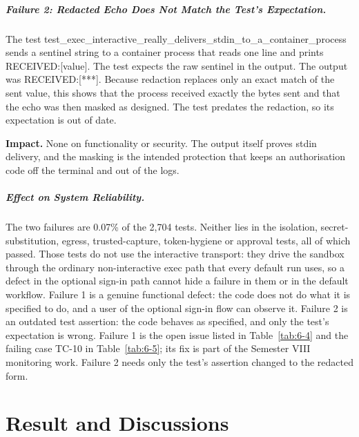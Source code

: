\documentclass[12pt,a4paper,oneside]{report}
\begin{document}
\paragraph{Failure 2: Redacted Echo Does Not Match the Test's Expectation.}\label{failure-2}

The test test\_\allowbreak{}exec\_\allowbreak{}interactive\_\allowbreak{}really\_\allowbreak{}delivers\_\allowbreak{}stdin\_\allowbreak{}to\_\allowbreak{}a\_\allowbreak{}container\_\allowbreak{}process sends a sentinel string to a container process that reads one line and prints RECEIVED:[value]. The test expects the raw sentinel in the output. The output was RECEIVED:[***]. Because redaction replaces only an exact match of the sent value, this shows that the process received exactly the bytes sent and that the echo was then masked as designed. The test predates the redaction, so its expectation is out of date.

\textbf{Impact.} None on functionality or security. The output itself proves stdin delivery, and the masking is the intended protection that keeps an authorisation code off the terminal and out of the logs.

\paragraph{Effect on System Reliability.}\label{failed-tests-reliability}

The two failures are 0.07\% of the 2,704 tests. Neither lies in the isolation, secret-substitution, egress, trusted-capture, token-hygiene or approval tests, all of which passed. Those tests do not use the interactive transport: they drive the sandbox through the ordinary non-interactive exec path that every default run uses, so a defect in the optional sign-in path cannot hide a failure in them or in the default workflow. Failure 1 is a genuine functional defect: the code does not do what it is specified to do, and a user of the optional sign-in flow can observe it. Failure 2 is an outdated test assertion: the code behaves as specified, and only the test's expectation is wrong. Failure 1 is the open issue listed in Table~\ref{tab:6-4} and the failing case TC-10 in Table~\ref{tab:6-5}; its fix is part of the Semester VIII monitoring work. Failure 2 needs only the test's assertion changed to the redacted form.


\clearpage

\chapter{Result and Discussions}\label{results-and-analysis}
\end{document}
